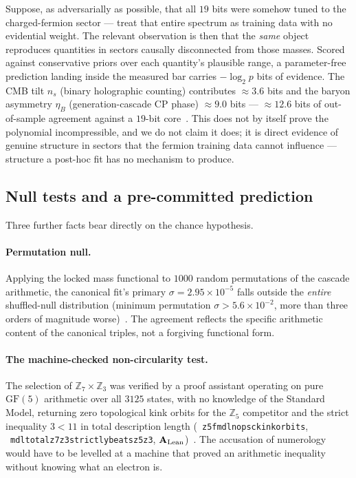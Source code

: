 \documentclass[11pt]{article}
\newcommand{\GF}[1]{\ensuremath{\mathrm{GF}(#1)}}
\newcommand{\lean}[1]{%
  \penalty-100
  \begingroup\def\_{\textunderscore\allowbreak}\texttt{#1}\endgroup}
\newcommand{\CatAL}{\ensuremath{\textbf{A}_{\rm Lean}}}
\begin{document}
Suppose, as adversarially as possible, that all $19$ bits were somehow tuned to the
charged-fermion sector --- treat that entire spectrum as training data with no
evidential weight.  The relevant observation is then that the \emph{same} object
reproduces quantities in sectors causally disconnected from those masses.  Scored
against conservative priors over each quantity's plausible range, a parameter-free
prediction landing inside the measured bar carries $-\log_2 p$ bits of evidence.
The CMB tilt $n_s$ (binary holographic counting) contributes $\approx 3.6$ bits and
the baryon asymmetry $\eta_B$ (generation-cascade CP phase) $\approx 9.0$ bits ---
$\approx 12.6$ bits of out-of-sample agreement against a $19$-bit
core~\cite{SpivackGTECompleteFramework}.  This does not by itself prove the
polynomial incompressible, and we do not claim it does; it is direct evidence of
genuine structure in sectors that the fermion training data cannot influence ---
structure a post-hoc fit has no mechanism to produce.

\subsection{Null tests and a pre-committed prediction}

Three further facts bear directly on the chance hypothesis.

\paragraph{Permutation null.}  Applying the locked mass functional to $1000$
random permutations of the cascade arithmetic, the canonical fit's primary
$\sigma = 2.95\times10^{-5}$ falls outside the \emph{entire} shuffled-null
distribution (minimum permutation $\sigma > 5.6\times10^{-2}$, more than three
orders of magnitude worse)~\cite{SpivackSM}.  The agreement reflects the specific
arithmetic content of the canonical triples, not a forgiving functional form.

\paragraph{The machine-checked non-circularity test.}  The selection of
$\mathbb{Z}_7\times\mathbb{Z}_3$ was verified by a proof assistant operating on
pure $\GF{5}$ arithmetic over all $3125$ states, with no knowledge of the Standard
Model, returning zero topological kink orbits for the $\mathbb{Z}_5$ competitor and
the strict inequality $3 < 11$ in total description length
(\mbox{\lean{z5\_fmdl\_no\_psc\_kink\_orbits}}, \mbox{\lean{mdl\_total\_z7z3\_strictly\_beats\_z5z3}},
\CatAL)~\cite{SpivackGTEPolynomialWolfram}.  The accusation of numerology would
have to be levelled at a machine that proved an arithmetic inequality without
knowing what an electron is.
\end{document}
